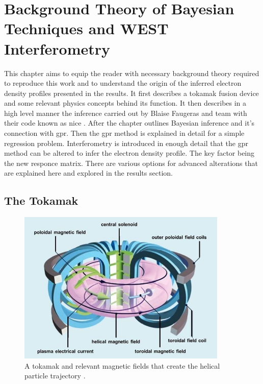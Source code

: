 \chapter{Background Theory of Bayesian Techniques and WEST Interferometry}

This chapter aims to equip the reader with necessary background theory required to reproduce this work and to understand the origin of the inferred electron density profiles presented in the results. It first describes a tokamak fusion device and some relevant physics concepts behind its function. It then describes in a high level manner the inference carried out by Blaise Faugeras and team with their code known as \gls{nice} \cite{nice}. After the chapter outlines Bayesian inference and it's connection with \gls{gpr}. Then the \gls{gpr} method is explained in detail for a simple regression problem. Interferometry is introduced in enough detail that the \gls{gpr} method can be altered to infer the electron density profile. The key factor being the new responce matrix. There are various options for advanced alterations that are explained here and explored in the results section.

\section{The Tokamak}

\begin{figure}[H]
  \centering
  \includegraphics[width=10cm]{images/tokamak.jpg}
  \caption{A tokamak and relevant magnetic fields that create the helical particle trajectory \cite{tokamakSchema}.}
  \label{fig:tokamakSchema}
\end{figure}

